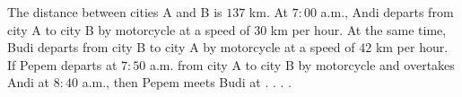 The distance between cities A and B is $137$ km. At $7:00$ a.m., Andi departs from city A to city B by motorcycle at a speed of $30$ km per hour. At the same time, Budi departs from city B to city A by motorcycle at a speed of $42$ km per hour. If Pepem departs at $7:50$ a.m. from city A to city B by motorcycle and overtakes Andi at $8:40$ a.m., then Pepem meets Budi at . . . .
